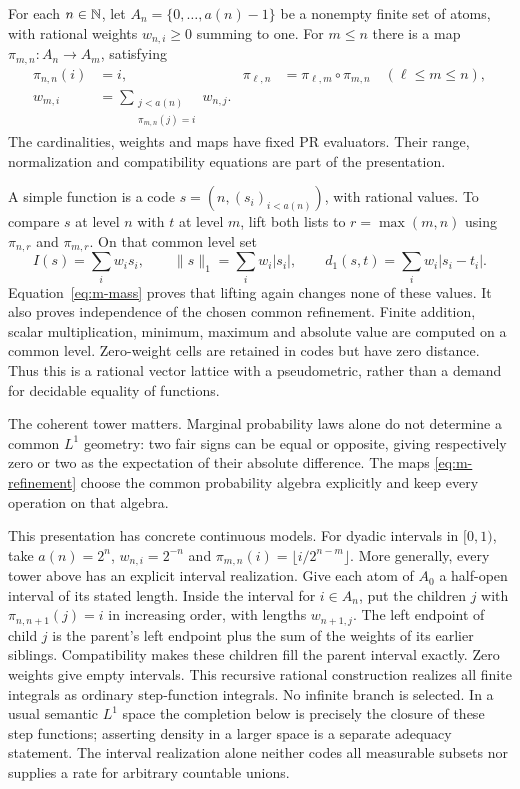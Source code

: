 \begin{definition}
For each $n\in\mathbb N$, let $A_n=\{0,\ldots,a(n)-1\}$ be a nonempty finite set
of atoms, with rational weights $w_{n,i}\ge0$ summing to one.  For $m\le n$
there is a map $\pi_{m,n}:A_n\to A_m$, satisfying
\begin{align}
 \pi_{n,n}(i)&=i,&
 \pi_{\ell,n}&=\pi_{\ell,m}\circ\pi_{m,n}\quad(\ell\le m\le n),
 \label{eq:m-refinement}\\
 w_{m,i}&=\sum_{\substack{j<a(n)\\\pi_{m,n}(j)=i}}w_{n,j}.
 \label{eq:m-mass}
\end{align}
The cardinalities, weights and maps have fixed PR evaluators.  Their range,
normalization and compatibility equations are part of the presentation.
\end{definition}

A simple function is a code $s=(n,(s_i)_{i<a(n)})$, with rational values.
To compare $s$ at level $n$ with $t$ at level $m$, lift both lists to
$r=\max(m,n)$ using $\pi_{n,r}$ and $\pi_{m,r}$.  On that common level set
\begin{equation}
 I(s)=\sum_iw_i s_i,\qquad
 \|s\|_1=\sum_iw_i|s_i|,\qquad
 d_1(s,t)=\sum_iw_i|s_i-t_i|.
 \label{eq:m-simple}
\end{equation}
Equation~\eqref{eq:m-mass} proves that lifting again changes none of these
values.  It also proves independence of the chosen common refinement.
Finite addition, scalar multiplication, minimum, maximum and absolute value
are computed on a common level.  Zero-weight cells are retained in codes
but have zero distance.  Thus this is a rational vector lattice with a
pseudometric, rather than a demand for decidable equality of functions.

The coherent tower matters.  Marginal probability laws alone do not
determine a common $L^1$ geometry: two fair signs can be equal or opposite,
giving respectively zero or two as the expectation of their absolute
difference.  The maps \eqref{eq:m-refinement} choose the common probability
algebra explicitly and keep every operation on that algebra.

This presentation has concrete continuous models.  For dyadic intervals
in $[0,1)$, take $a(n)=2^n$, $w_{n,i}=2^{-n}$ and
$\pi_{m,n}(i)=\lfloor i/2^{n-m}\rfloor$.  More generally, every tower above
has an explicit interval realization.  Give each atom of $A_0$ a half-open
interval of its stated length.  Inside the interval for $i\in A_n$, put
the children $j$ with $\pi_{n,n+1}(j)=i$ in increasing order, with lengths
$w_{n+1,j}$.  The left endpoint of child $j$ is the parent's left endpoint
plus the sum of the weights of its earlier siblings.  Compatibility makes
these children fill the parent interval exactly.  Zero weights give empty
intervals.  This recursive rational construction realizes all finite
integrals as ordinary step-function integrals.  No infinite branch is
selected.  In a usual semantic $L^1$ space the completion below is precisely
the closure of these step functions; asserting density in a larger space
is a separate adequacy statement.  The interval realization alone neither
codes all measurable subsets nor supplies a rate for arbitrary countable
unions.

